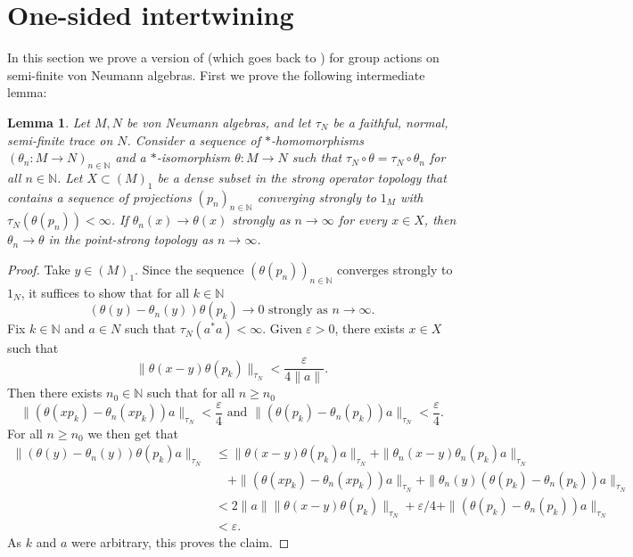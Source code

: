 \documentclass[11pt,a4paper]{article}
\newtheorem{lemma}[theorem]{Lemma}
\theoremstyle{definition}
\theoremstyle{remark}
\numberwithin{equation}{section}
\numberwithin{theorem}{section}
\newcommand{\N}{\mathbb{N}}
\newcommand{\e}{\varepsilon}
\begin{document}
\section{One-sided intertwining}
In this section we prove a version of \cite[Lemma~2.1]{Szabo18ssa} (which goes back to \cite[Proposition 2.3.5]{Rordam}) for group actions on semi-finite von Neumann algebras. First we prove the following intermediate lemma:

\begin{lemma}\label{lemma:point_strong_dense_subset}
Let $M, N$ be von Neumann algebras, and let $\tau_N$ be  a faithful, normal, semi-finite trace on $N$. 
Consider a sequence of $*$-homomorphisms $(\theta_n\colon M \rightarrow N)_{n \in \N}$ and a $*$-isomorphism $\theta:M \rightarrow N$ such that $\tau_N \circ \theta = \tau_N \circ \theta_n$ for all $n \in \N$. 
Let $X \subset (M)_1$ be a dense subset in the strong operator topology that contains a sequence of projections $(p_n)_{n \in \N}$ converging strongly to $1_M$ with $\tau_N (\theta(p_n)) < \infty$. 
If $\theta_n (x) \rightarrow \theta(x)$ strongly as $n \rightarrow \infty$ for every $x \in X$, then $\theta_n \rightarrow \theta$ in the point-strong topology as $n \rightarrow \infty$.
\end{lemma}
\begin{proof}
Take $y \in (M)_1$. Since the sequence $(\theta(p_n))_{n \in \N}$ converges strongly to $1_N$, it suffices to show that for all $k \in \N$
\[ (\theta(y)-\theta_n(y)) \theta(p_k) \rightarrow 0 \text{ strongly as } n \rightarrow \infty.\]
Fix $k \in \N$ and $a \in N$ such that $\tau_N(a^*a) < \infty$. Given $\e>0$, there exists $x \in X$ such that 
\[\|\theta(x-y)\theta(p_k)\|_{\tau_N} < \frac{\e}{4\|a\|}.\]
 Then there exists $n_0 \in \N$ such that for all $n \geq n_0$ 
 \[\|(\theta(x p_k) - \theta_n ( x p_k))a\|_{\tau_N} < \frac{\e}{4} \text{ and } \|(\theta(p_k)-\theta_n(p_k))a\|_{\tau_N} < \frac{\e}{4}.\] 
For all $n \geq n_0$ we then get that
\begin{align*}
\|(\theta(y) - \theta_n(y))\theta(p_k)a\|_{\tau_N} &\leq \|\theta(x-y)\theta(p_k)a\|_{\tau_N} + \|\theta_n(x-y)\theta_n(p_k)a\|_{\tau_N}\\
&\quad + \|(\theta(xp_k) - \theta_n(xp_k))a\|_{\tau_N} + \|\theta_n(y)(\theta(p_k) - \theta_n(p_k))a\|_{\tau_N}\\
&< 2\|a\| \|\theta(x-y)\theta(p_k)\|_{\tau_N} +\e/4 + \|(\theta(p_k)-\theta_n(p_k))a\|_{\tau_N} \\
&< \e.
\end{align*}
As $k$ and $a$ were arbitrary, this proves the claim.
\end{proof}
\end{document}
